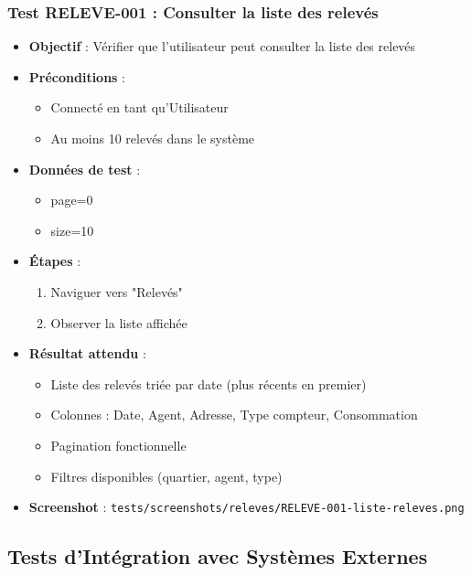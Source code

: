 \subsubsection{Test RELEVE-001 : Consulter la liste des relevés}
\begin{itemize}
    \item \textbf{Objectif} : Vérifier que l'utilisateur peut consulter la liste des relevés
    \item \textbf{Préconditions} : 
        \begin{itemize}
            \item Connecté en tant qu'Utilisateur
            \item Au moins 10 relevés dans le système
        \end{itemize}
    \item \textbf{Données de test} :
        \begin{itemize}
            \item page=0
            \item size=10
        \end{itemize}
    \item \textbf{Étapes} :
        \begin{enumerate}
            \item Naviguer vers "Relevés"
            \item Observer la liste affichée
        \end{enumerate}
    \item \textbf{Résultat attendu} : 
        \begin{itemize}
            \item Liste des relevés triée par date (plus récents en premier)
            \item Colonnes : Date, Agent, Adresse, Type compteur, Consommation
            \item Pagination fonctionnelle
            \item Filtres disponibles (quartier, agent, type)
        \end{itemize}
    \item \textbf{Screenshot} : \texttt{tests/screenshots/releves/RELEVE-001-liste-releves.png}
\end{itemize}

\subsection{Tests d'Intégration avec Systèmes Externes}

